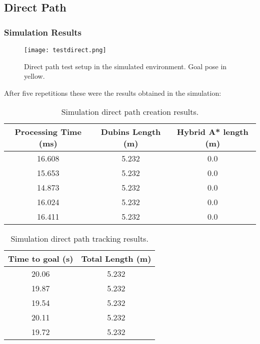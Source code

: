 \subsection{Direct Path}
\label{subsec:direct_path}
\subsubsection{Simulation Results}

\begin{figure}[h]
    \centering
    \texttt{[image: testdirect.png]}
    \caption{Direct path test setup in the simulated environment. Goal pose in yellow.}
    \label{fig:direct_path}
\end{figure}
After five repetitions these were the results obtained in the simulation:

\begin{table}[H]
    \centering
    \begin{tabular}{|c|c|c|}
        \hline
        \textbf{Processing Time (ms)} & \textbf{Dubins Length (m)} & \textbf{Hybrid A* length (m)} \\
        \hline
         16.608 & 5.232 & 0.0  \\
        \hline
         15.653 & 5.232 & 0.0 \\
         \hline
         14.873 & 5.232 & 0.0 \\
         \hline
         16.024 & 5.232 & 0.0 \\
         \hline
         16.411 & 5.232 & 0.0 \\
         \hline
    \end{tabular}
    \caption{Simulation direct path creation results.}
    \label{tab:direct_path_results1}
\end{table}
\begin{table}[H]
    \centering
    \begin{tabular}{|c|c|}
        \hline
        \textbf{Time to goal (s)} & \textbf{Total Length (m)} \\
        \hline
        20.06 & 5.232 \\
        \hline
        19.87 & 5.232 \\
         \hline
         19.54 & 5.232 \\
         \hline
         20.11 & 5.232 \\
         \hline
         19.72 & 5.232 \\
         \hline
    \end{tabular}
    \caption{Simulation direct path tracking results.}
    \label{tab:direct_path_results2}
\end{table}


